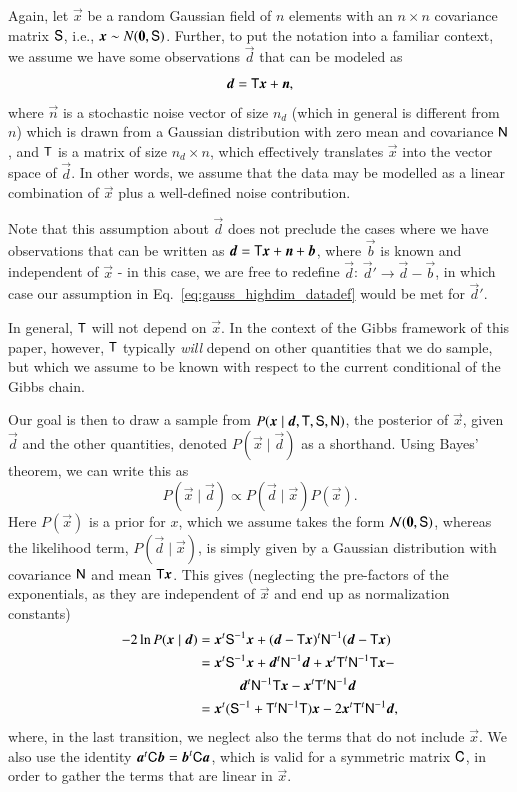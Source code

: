\documentclass[onecolumn]{aa}
\renewcommand{\d}[0]{\vec{d}}
\newcommand{\n}[0]{\vec{n}}
\newcommand{\x}[0]{\vec{x}}
\renewcommand{\a}[0]{\vec{a}}
\newcommand{\T}[0]{\tens{T}}
\renewcommand{\b}[0]{\vec{b}}
\newcommand{\N}[0]{\tens{N}}
\renewcommand{\C}[0]{\tens{C}}
\renewcommand{\S}[0]{\tens{S}}
\begin{document}
Again, let $\x$ be a random Gaussian field of $n$ elements with an
$n\times n$ covariance matrix $\S$, i.e., $\x \sim N(\vec 0,
\S)$. Further, to put the notation into a familiar context, we assume
we have some observations $\d$ that can be modeled as
\begin{equation}
    \d = \T\x + \n,
    \label{eq:gauss_highdim_datadef}
\end{equation}
where $\n$ is a stochastic noise vector of size $n_d$ (which in
general is different from $n$) which is drawn from a Gaussian
distribution with zero mean and covariance $\N$, and $\T$ is a matrix
of size $n_d\times n$, which effectively translates $\x$ into the
vector space of $\d$. In other words, we assume that the data may be
modelled as a linear combination of $\x$ plus a well-defined noise
contribution.

Note that this assumption about $\d$ does not preclude the cases where we have observations that can be written as $\d = \T\x + \n + \b$, where $\b$ is known and independent of $\x$ - in this case, we are free to redefine $\d$: $\d' \rightarrow \d - \b$, in which case our assumption in Eq.~\eqref{eq:gauss_highdim_datadef} would be met for $\d'$.

In general, $\T$ will not depend on $\x$. In the context of the Gibbs
framework of this paper, however, $\T$ typically \emph{will} depend on
other quantities that we do sample, but which we assume to be known
with respect to the current conditional of the Gibbs chain.

Our goal is then to draw a sample from $P(\x \mid  \d, \T, \S, \N)$, the
posterior of $\x$, given $\d$ and the other quantities, denoted
$P(\x\mid \d)$ as a shorthand. Using Bayes' theorem, we can write this as
\begin{equation}
    P(\x \mid  \d) \propto P(\d \mid  \x) P(\x).
\end{equation}
Here $P(\x)$ is a prior for $x$, which we assume takes the form
$\mathcal{N}(\vec 0, \S)$, whereas the likelihood term, $P(\d \mid  \x)$, is
simply given by a Gaussian distribution with covariance $\N$ and mean $\T\x$.
This gives (neglecting the pre-factors of the exponentials, as they are independent of $\x$ and end up as normalization constants)
\begin{align}
    -2\ln P(\x\mid \d) & = \x^t\S^{-1}\x + (\d-\T\x)^t\N^{-1}(\d - \T\x) \nonumber \\
             & = \x^t\S^{-1}\x + \d^t\N^{-1}\d + \x^t\T^t\N^{-1}\T\x -\nonumber
    \\ &\quad\quad\quad\d^t\N^{-1}\T\x - \x^t\T^t\N^{-1}\d \nonumber \\ 
             & = \x^t(\S^{-1} + \T^t\N^{-1}\T)\x - 2\x^t\T^t\N^{-1}\d,
    \label{eq:gauss_highdim_posterior}
\end{align}
where, in the last transition, we neglect also the terms that do not
include $\x$. We also use the identity $\a^t\C \b = \b^t\C \a$,
which is valid for a symmetric matrix $\C$, in order to gather the
terms that are linear in $\x$.
\end{document}
